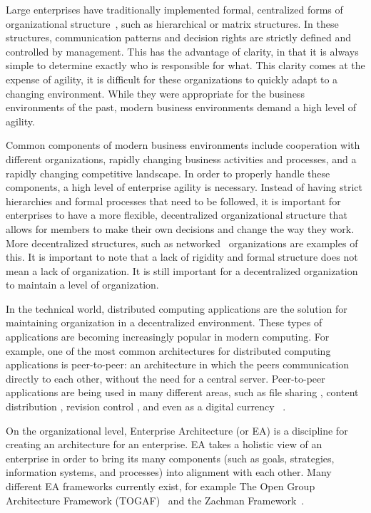 Large enterprises have traditionally implemented formal, centralized forms of organizational structure~\cite{pearlson2009}, such as hierarchical or matrix structures. In these structures, communication patterns and decision rights are strictly defined and controlled by management.  This has the advantage of clarity, in that it is always simple to determine exactly who is responsible for what. This clarity comes at the expense of agility, it is difficult for these organizations to quickly adapt to a changing environment. While they were appropriate for the business environments of the past, modern business environments demand a high level of agility.

Common components of modern business environments include cooperation with different organizations,  rapidly changing business activities and processes, and a rapidly changing competitive landscape. In order to properly handle these components, a high level of enterprise agility is necessary. Instead of having strict hierarchies and formal processes that need to be followed, it is important for enterprises to have a more flexible, decentralized organizational structure that allows for members to make their own decisions and change the way they work. More decentralized structures, such as networked~\cite{pearlson2009} organizations are examples of this. It is important to note that a lack of rigidity and formal structure does not mean a lack of organization. It is still important for a decentralized organization to maintain a level of organization.

In the technical world, distributed computing applications are the solution for maintaining organization in a decentralized environment. These types of applications are becoming increasingly popular in modern computing. For example, one of the most common architectures for distributed computing applications is peer-to-peer: an architecture in which the peers communication directly to each other, without the need for a central server. Peer-to-peer applications are being used in many different areas, such as file sharing \cite{bittorrent}, content distribution \cite{blizzard}, revision control \cite{progit}, and even as a digital currency ~\cite{bitcoin2008}.

On the organizational level, Enterprise Architecture (or EA) is a discipline for creating an architecture for an enterprise. EA takes a holistic view of an enterprise in order to bring its many components (such as goals, strategies, information systems, and processes) into alignment with each other. Many different EA frameworks currently exist, for example The Open Group Architecture Framework (TOGAF)~\cite{togaf9.1} and the Zachman Framework~\cite{zachman}. 

